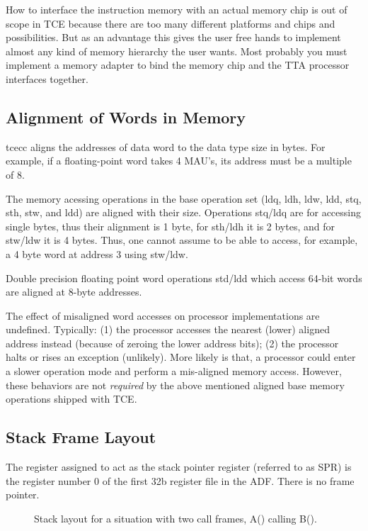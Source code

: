 \documentclass[twoside]{tceusermanual}
\begin{document}
How to interface the instruction memory with an actual memory chip is out of
scope in TCE because there are too many different platforms and chips and
possibilities. But as an advantage this gives the user free hands to
implement almost any kind of memory hierarchy the user wants. Most probably
you must implement a memory adapter to bind the memory chip and the TTA
processor interfaces together.

\subsection{Alignment of Words in Memory}
\label{ssec:align-conventions}

tcecc aligns the addresses of data word to the data type size in bytes.
For example, if a floating-point word takes 4 MAU's, its address must be 
a multiple of 8. 

The memory acessing operations in the base operation set (ldq, ldh, ldw,
ldd, stq, sth, stw, and ldd) are aligned with their size. Operations stq/ldq
are for accessing single bytes, thus their alignment is 1 byte, 
for sth/ldh it is 2 bytes, and for stw/ldw it is 4 bytes. Thus, one cannot 
assume to be able to access, for example, a 4 byte word at address 3
using stw/ldw.

Double precision floating point word operations std/ldd which access
64-bit words are aligned at 8-byte addresses. 

The effect of misaligned word accesses on processor implementations are
undefined. Typically: (1) the processor accesses the nearest (lower) aligned
address instead (because of zeroing the lower address bits); (2) the processor 
halts or rises an exception (unlikely). More likely is that, a processor 
could enter a slower operation mode and perform a mis-aligned memory access.
However, these behaviors are not \textit{required} by the above mentioned 
aligned base memory operations shipped with TCE.

\subsection{Stack Frame Layout}
\label{sec:stack-layout}

The register assigned to act as the stack pointer register (referred to as 
SPR) is the register number 0 of the first 32b register file in the ADF. 
There is no frame pointer.

\begin{figure}[t]
  \centerline{
  }
  \caption{Stack layout for a situation with two call frames, A() calling B().}
  \label{fig:stack-frame}
\end{figure}
\end{document}
